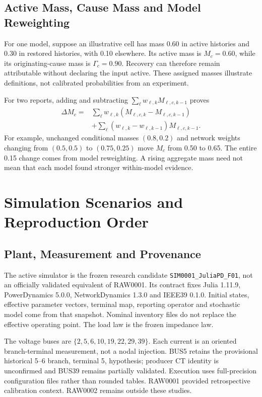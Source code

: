 \subsection{Active Mass, Cause Mass and Model Reweighting}

For one model, suppose an illustrative cell has mass 0.60 in active
histories and 0.30 in restored histories, with 0.10 elsewhere. Its active
mass is $M_c=0.60$, while its originating-cause mass is $\Gamma_c=0.90$.
Recovery can therefore remain attributable without declaring the input
active. These assigned masses illustrate definitions, not calibrated
probabilities from an experiment.

For two reports, adding and subtracting
$\sum_\ell w_{\ell,k}M_{\ell,c,k-1}$ proves
\begin{align}
 \Delta M_c={}&\sum_\ell w_{\ell,k}
       (M_{\ell,c,k}-M_{\ell,c,k-1})\nonumber\\
 &+\sum_\ell(w_{\ell,k}-w_{\ell,k-1})M_{\ell,c,k-1}.
\end{align}
For example, unchanged conditional masses $(0.8,0.2)$ and network weights
changing from $(0.5,0.5)$ to $(0.75,0.25)$ move $M_c$ from 0.50 to 0.65.
The entire 0.15 change comes from model reweighting. A rising aggregate
mass need not mean that each model found stronger within-model evidence.

\section{Simulation Scenarios and Reproduction Order}
\label{app:current-scenarios}

\subsection{Plant, Measurement and Provenance}

The active simulator is the frozen research candidate
\texttt{SIM0001\_JuliaPD\_F01}, not an officially validated equivalent of
RAW0001. Its contract fixes Julia 1.11.9, PowerDynamics 5.0.0,
NetworkDynamics 1.3.0 and IEEE39 0.1.0. Initial states, effective parameter
vectors, terminal map, reporting operator and stochastic model come from
that snapshot. Nominal inventory files do not replace the effective
operating point. The load law is the frozen impedance law.

The voltage buses are $\{2,5,6,10,19,22,29,39\}$. Each current is an
oriented branch-terminal measurement, not a nodal injection. BUS5 retains
the provisional historical 5--6 branch, terminal 5, hypothesis; producer
CT identity is unconfirmed and BUS39 remains partially validated.
Execution uses full-precision configuration files rather than rounded
tables. RAW0001 provided retrospective calibration context. RAW0002
remains outside these studies.

